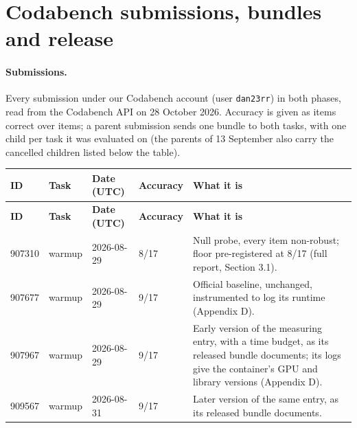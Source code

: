 \section{Codabench submissions, bundles and release}\label{app:K}

\paragraph{Submissions.} Every submission under our Codabench account (user \texttt{dan23rr}) in both phases, read from the Codabench API on 28 October 2026. Accuracy is given as items correct over items; a parent submission sends one bundle to both tasks, with one child per task it was evaluated on (the parents of 13 September also carry the cancelled children listed below the table).

{\footnotesize\setlength{\tabcolsep}{4pt}

\begin{longtable}{L{1.3cm}L{1.9cm}L{1.7cm}L{1.5cm}L{5.9cm}}

\toprule

\textbf{ID} & \textbf{Task} & \textbf{Date (UTC)} & \textbf{Accuracy} & \textbf{What it is} \\

\midrule

\endfirsthead

\toprule

\textbf{ID} & \textbf{Task} & \textbf{Date (UTC)} & \textbf{Accuracy} & \textbf{What it is} \\

\midrule

\endhead

\bottomrule

\endlastfoot

907310 & warmup & 2026-08-29 & 8/17 & Null probe, every item non-robust; floor pre-registered at 8/17 (full report, Section 3.1). \\

907677 & warmup & 2026-08-29 & 9/17 & Official baseline, unchanged, instrumented to log its runtime (Appendix D). \\

907967 & warmup & 2026-08-29 & 9/17 & Early version of the measuring entry, with a time budget, as its released bundle documents; its logs give the container's GPU and library versions (Appendix D). \\

909567 & warmup & 2026-08-31 & 9/17 & Later version of the same entry, as its released bundle documents. \\


\end{longtable}}
